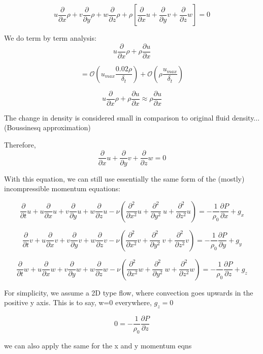 \documentclass[11pt]{article}
\begin{document}
$$u \frac{\partial}{\partial x} \rho  + v \frac{\partial}{\partial y}  \rho  +  w \frac{\partial}{\partial z} \rho   + \rho \left[ \frac{\partial}{\partial x} u +  \frac{\partial}{\partial y} v +  \frac{\partial}{\partial z} w \right] = 0$$

We do term by term analysis:
$$u \frac{\partial }{\partial x} \rho + \rho \frac{\partial u}{\partial x}$$

$$= \mathcal{O}(u_{max} \frac{0.02 \rho}{\delta_t})+ \mathcal{O}(\rho \frac{ u_{max}}{\delta_t})$$

$$u \frac{\partial }{\partial x} \rho + \rho \frac{\partial u}{\partial x} \approx \rho \frac{\partial u}{\partial x}$$

The change in density is considered small in comparison to original fluid density... (Boussinesq approximation)

Therefore,
$$  \frac{\partial}{\partial x} u +  \frac{\partial}{\partial y} v +  \frac{\partial}{\partial z} w = 0$$

With this equation, we can still use essentially the same form of the (mostly) incompressible momentum equations:

$$\frac{\partial }{\partial t} u + u \frac{\partial}{\partial x} u + v \frac{\partial}{\partial y} u + w \frac{\partial}{\partial z} u - \nu ( \frac{\partial^2}{\partial x^2} u + \frac{\partial^2}{\partial y^2} \ u + \frac{\partial^2}{\partial z^2} u) = - \frac{1}{\rho_0} \frac{\partial P}{\partial x} +g_x$$

$$\frac{\partial }{\partial t} v + u \frac{\partial}{\partial x} v + v \frac{\partial}{\partial y} v + w \frac{\partial}{\partial z} v - \nu ( \frac{\partial^2}{\partial x^2} v + \frac{\partial^2}{\partial y^2} \ v + \frac{\partial^2}{\partial z^2} v) = - \frac{1}{\rho_0} \frac{\partial P}{\partial y} +g_y$$

$$\frac{\partial }{\partial t} w + u \frac{\partial}{\partial x} w + v \frac{\partial}{\partial y} w + w \frac{\partial}{\partial z} w - \nu ( \frac{\partial^2}{\partial x^2} w + \frac{\partial^2}{\partial y^2} \ w + \frac{\partial^2}{\partial z^2} w) = - \frac{1}{\rho_0} \frac{\partial P}{\partial z} +g_z$$

For simplicity, we assume a 2D type flow, where convection goes upwards in the positive y axis. This is to say, w=0 everywhere, $g_z=0$

$$0 = - \frac{1}{\rho_0} \frac{\partial P}{\partial z} $$

we can also apply the same for the x and y momentum eqns
\end{document}
